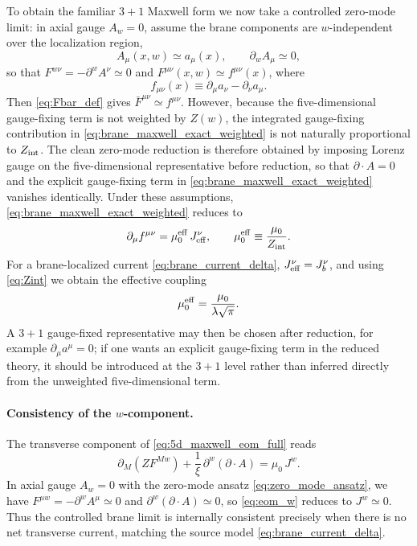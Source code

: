 \documentclass[11pt]{article}
\newcommand{\A}{A}
\newcommand{\F}{F}
\newcommand{\J}{J}
\newcommand{\Z}{Z}
\newcommand{\lam}{\lambda}      %
\newcommand{\Zint}{Z_{\rm int}} %
\newcommand{\muo}{\mu_0}
\newcommand{\mueff}{\mu_0^{\rm eff}}
\newcommand{\xigf}{\xi}
\begin{document}
To obtain the familiar \(3+1\) Maxwell form we now take a controlled zero-mode
limit: in axial gauge \(\A_w=0\), assume the brane components are \(w\)-independent
over the localization region,
\begin{equation}
  \A_\mu(x,w) \simeq a_\mu(x),
  \qquad
  \partial_w \A_\mu \simeq 0,
  \label{eq:zero_mode_ansatz}
\end{equation}
so that \(\F^{w\nu}=-\partial^w\A^\nu\simeq 0\) and
\(\F^{\mu\nu}(x,w)\simeq f^{\mu\nu}(x)\), where
\begin{equation}
  f_{\mu\nu}(x)\equiv \partial_\mu a_\nu-\partial_\nu a_\mu.
\end{equation}
Then \cref{eq:Fbar_def} gives \(\bar{\F}^{\mu\nu}\simeq f^{\mu\nu}\). However,
because the five-dimensional gauge-fixing term is not weighted by \(\Z(w)\), the
integrated gauge-fixing contribution in \cref{eq:brane_maxwell_exact_weighted} is
not naturally proportional to \(\Zint\). The clean zero-mode reduction is
therefore obtained by imposing Lorenz gauge on the five-dimensional
representative before reduction, so that \(\partial\!\cdot\!\A=0\) and the
explicit gauge-fixing term in \cref{eq:brane_maxwell_exact_weighted} vanishes
identically. Under these assumptions, \cref{eq:brane_maxwell_exact_weighted}
reduces to
\begin{equation}
  \partial_\mu f^{\mu\nu}
  = \mueff\,\J_{\rm eff}^\nu,
  \qquad
  \mueff \equiv \frac{\muo}{\Zint}.
  \label{eq:brane_maxwell_gf}
\end{equation}
For a brane-localized current \cref{eq:brane_current_delta}, \(\J_{\rm eff}^\nu=\J_b^\nu\),
and using \cref{eq:Zint} we obtain the effective coupling
\begin{equation}
  \mueff = \frac{\muo}{\lam\sqrt{\pi}}.
  \label{eq:mu0_eff}
\end{equation}
A \(3+1\) gauge-fixed representative may then be chosen after reduction, for
example \(\partial_\mu a^\mu=0\); if one wants an explicit gauge-fixing term in
the reduced theory, it should be introduced at the \(3+1\) level rather than
inferred directly from the unweighted five-dimensional term.

\paragraph{Consistency of the \(w\)-component.}
The transverse component of \cref{eq:5d_maxwell_eom_full} reads
\begin{equation}
  \partial_M\!\left(\Z \F^{Mw}\right)
  + \frac{1}{\xigf}\,\partial^w(\partial\!\cdot\!\A)
  = \muo\,\J^w.
  \label{eq:eom_w}
\end{equation}
In axial gauge \(\A_w=0\) with the zero-mode ansatz \cref{eq:zero_mode_ansatz},
we have \(\F^{\mu w}=-\partial^w\A^\mu\simeq 0\) and \(\partial^w(\partial\!\cdot\!\A)\simeq 0\),
so \cref{eq:eom_w} reduces to \(\J^w\simeq 0\). Thus the controlled brane limit is
internally consistent precisely when there is no net transverse current, matching
the source model \cref{eq:brane_current_delta}.
\end{document}
